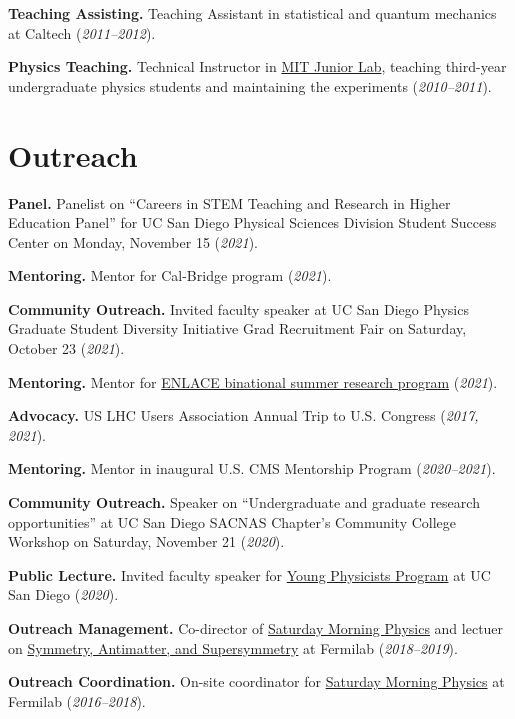 \documentclass{res}
\newcommand{\MarginText}[1]{\section{#1}\vspace{10pt}}
\begin{document}
\begin{resume}
  \textbf{Teaching Assisting.} Teaching Assistant in statistical and quantum mechanics at Caltech (\textit{2011--2012}).

  \textbf{Physics Teaching.} Technical Instructor in \href{http://web.mit.edu/8.13/www/index.shtml}{MIT Junior Lab}, teaching third-year undergraduate physics students and maintaining the experiments (\textit{2010--2011}).


  \MarginText{Outreach}

  \textbf{Panel.} Panelist on ``Careers in STEM Teaching and Research in Higher Education Panel'' for UC San Diego Physical Sciences Division Student Success Center on Monday, November 15 (\textit{2021}).

  \textbf{Mentoring.} Mentor for Cal-Bridge program (\textit{2021}).

  \textbf{Community Outreach.} Invited faculty speaker at UC San Diego Physics Graduate Student Diversity Initiative Grad Recruitment Fair on Saturday, October 23 (\textit{2021}).

  \textbf{Mentoring.} Mentor for \href{http://resilientmaterials.ucsd.edu/ENLACE}{ENLACE binational summer research program} (\textit{2021}).

  \textbf{Advocacy.} US LHC Users Association Annual Trip to U.S. Congress (\textit{2017, 2021}).

  \textbf{Mentoring.} Mentor in inaugural U.S. CMS Mentorship Program (\textit{2020--2021}).

  \textbf{Community Outreach.} Speaker on ``Undergraduate and graduate research opportunities'' at UC San Diego SACNAS Chapter's Community College Workshop on Saturday, November 21 (\textit{2020}).

  \textbf{Public Lecture.} Invited faculty speaker for \href{http://ypp.ucsd.edu/}{Young Physicists Program} at UC San Diego (\textit{2020}).

  \textbf{Outreach Management.} Co-director of \href{http://saturdaymorningphysics.fnal.gov/}{Saturday
    Morning Physics} and lectuer on \href{http://saturdaymorningphysics.fnal.gov/fall-session-2018/}{Symmetry, Antimatter, and Supersymmetry} at Fermilab (\textit{2018--2019}).

  \textbf{Outreach Coordination.} On-site coordinator for \href{http://saturdaymorningphysics.fnal.gov/}{Saturday Morning Physics} at Fermilab (\textit{2016--2018}).


\end{resume}
\end{document}

